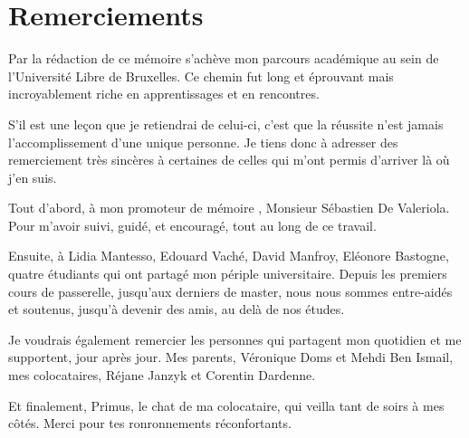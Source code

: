 \chapter*{Remerciements}

\setlength{\parskip}{0,5cm}%

Par la rédaction de ce mémoire s'achève mon parcours académique au sein de l'Université Libre de Bruxelles.
Ce chemin fut long et éprouvant  mais  incroyablement riche en apprentissages et en rencontres.

S'il est une leçon que je retiendrai de celui-ci, c'est que la réussite n'est jamais l'accomplissement d'une unique personne. Je tiens donc à adresser des remerciement très sincères à certaines de celles qui m'ont permis d'arriver là où j'en suis.

Tout d'abord, à mon promoteur de mémoire , Monsieur Sébastien De Valeriola. Pour m'avoir suivi, guidé, et encouragé, tout au long de ce travail. 

Ensuite, à Lidia Mantesso, Edouard Vaché, David Manfroy, Eléonore Bastogne, quatre étudiants qui ont partagé mon périple universitaire. Depuis les premiers cours de passerelle, jusqu'aux derniers de master, nous nous sommes entre-aidés et soutenus, jusqu'à devenir des amis, au delà de nos études.

Je voudrais également remercier les personnes qui partagent mon quotidien et me supportent, jour après jour. Mes parents, Véronique Doms et Mehdi Ben Ismail, mes colocataires, Réjane Janzyk et Corentin Dardenne. 

Et finalement, Primus, le chat de ma colocataire, qui veilla tant de soirs à mes côtés. Merci pour tes ronronnements réconfortants.

\setlength{\parskip}{0cm}%